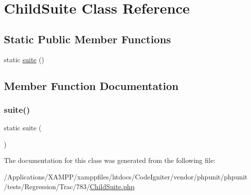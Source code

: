 \hypertarget{class_child_suite}{}\section{Child\+Suite Class Reference}
\label{class_child_suite}
\subsection*{Static Public Member Functions}
\begin{DoxyCompactItemize}
\item 
static \mbox{\hyperlink{class_child_suite_ae613daa28fb6b747c1940f6c9becccf7}{suite}} ()
\end{DoxyCompactItemize}


\subsection{Member Function Documentation}
\mbox{\label{class_child_suite_ae613daa28fb6b747c1940f6c9becccf7}} 
\subsubsection{\texorpdfstring{suite()}{suite()}}
{\footnotesize\ttfamily static suite (\begin{DoxyParamCaption}{ }\end{DoxyParamCaption})\hspace{0.3cm}{\ttfamily [static]}}



The documentation for this class was generated from the following file\+:\begin{DoxyCompactItemize}
\item 
/\+Applications/\+X\+A\+M\+P\+P/xamppfiles/htdocs/\+Code\+Igniter/vendor/phpunit/phpunit/tests/\+Regression/\+Trac/783/\mbox{\hyperlink{_child_suite_8php}{Child\+Suite.\+php}}\end{DoxyCompactItemize}
